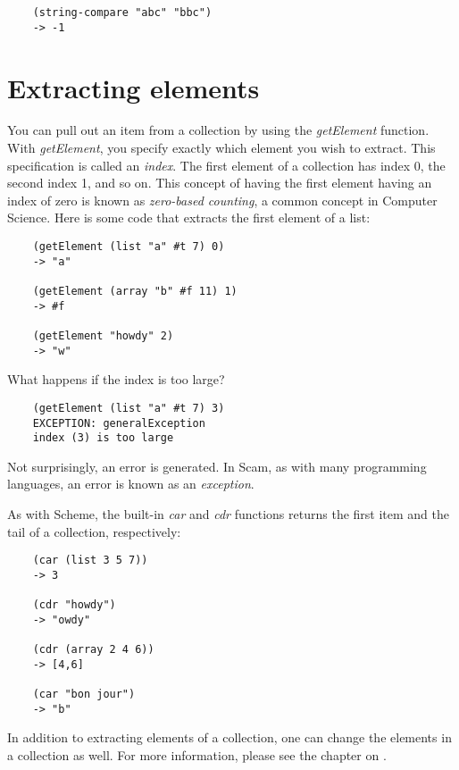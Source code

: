 \begin{verbatim}
    (string-compare "abc" "bbc")
    -> -1
\end{verbatim}

\section{Extracting elements}

You can pull out an item from a collection
by using the
{\it getElement} function.
With {\it getElement},
you specify exactly which element
you wish to extract. This specification is called an
{\it index}. The first element of a collection has index 0, the second
index 1, and so on. This concept of having the first element having
an index of zero is known as {\it zero-based counting}, a common concept
in Computer Science. Here is some code that extracts the first element
of a list:

\begin{verbatim}
    (getElement (list "a" #t 7) 0)
    -> "a"

    (getElement (array "b" #f 11) 1)
    -> #f

    (getElement "howdy" 2)
    -> "w"
\end{verbatim}

What happens if the index is too large?

\begin{verbatim}
    (getElement (list "a" #t 7) 3)
    EXCEPTION: generalException
    index (3) is too large
\end{verbatim}

Not surprisingly, an error is generated.
In Scam, as with many programming languages, an error is known
as an {\it exception}.

As with Scheme, the built-in {\it car} and {\it cdr} functions
returns the first item and the tail of a collection, respectively:

\begin{verbatim}
    (car (list 3 5 7))
    -> 3

    (cdr "howdy")
    -> "owdy"

    (cdr (array 2 4 6))
    -> [4,6]

    (car "bon jour")
    -> "b"
\end{verbatim}

In addition to extracting elements of a collection, one can 
change the elements in a collection as well. For more
information, please see the chapter on 
.

